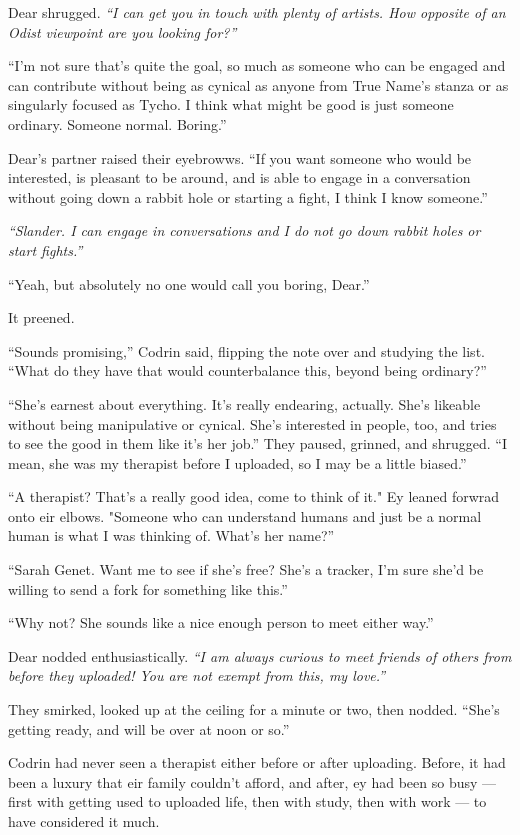 Dear shrugged. \emph{``I can get you in touch with plenty of artists. How opposite of an Odist viewpoint are you looking for?''}

``I'm not sure that's quite the goal, so much as someone who can be engaged and can contribute without being as cynical as anyone from True Name's stanza or as singularly focused as Tycho. I think what might be good is just someone ordinary. Someone normal. Boring.''

Dear's partner raised their eyebrowws. ``If you want someone who would be interested, is pleasant to be around, and is able to engage in a conversation without going down a rabbit hole or starting a fight, I think I know someone.''

\emph{``Slander. I can engage in conversations and I do not go down rabbit holes or start fights.''}

``Yeah, but absolutely no one would call you boring, Dear.''

It preened.

``Sounds promising,'' Codrin said, flipping the note over and studying the list. ``What do they have that would counterbalance this, beyond being ordinary?''

``She's earnest about everything. It's really endearing, actually. She's likeable without being manipulative or cynical. She's interested in people, too, and tries to see the good in them like it's her job.'' They paused, grinned, and shrugged. ``I mean, she was my therapist before I uploaded, so I may be a little biased.''

``A therapist? That's a really good idea, come to think of it." Ey leaned forwrad onto eir elbows. "Someone who can understand humans and just be a normal human is what I was thinking of. What's her name?''

``Sarah Genet. Want me to see if she's free? She's a tracker, I'm sure she'd be willing to send a fork for something like this.''

``Why not? She sounds like a nice enough person to meet either way.''

Dear nodded enthusiastically. \emph{``I am always curious to meet friends of others from before they uploaded! You are not exempt from this, my love.''}

They smirked, looked up at the ceiling for a minute or two, then nodded. ``She's getting ready, and will be over at noon or so.''

Codrin had never seen a therapist either before or after uploading. Before, it had been a luxury that eir family couldn't afford, and after, ey had been so busy — first with getting used to uploaded life, then with study, then with work — to have considered it much.

